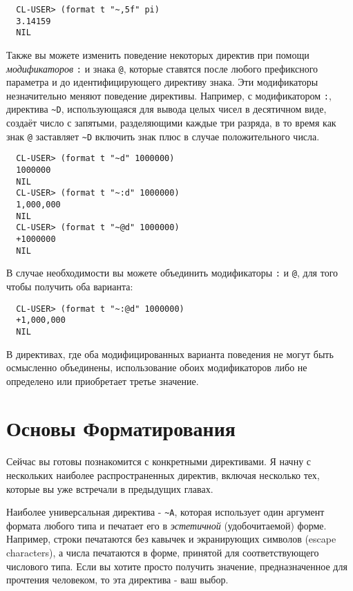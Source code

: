 {\begin{verbatim}
  CL-USER> (format t "~,5f" pi)
  3.14159
  NIL
\end{verbatim}

Также вы можете изменить поведение некоторых директив при помощи \textit{модификаторов}
\lstinline!:! и знака \lstinline!@!, которые ставятся после любого префиксного параметра и
до идентифицирующего директиву знака. Эти модификаторы незначительно меняют поведение
директивы. Например, с модификатором \lstinline!:!, директива \lstinline!~D!,
использующаяся для вывода целых чисел в десятичном виде, создаёт число с запятыми,
разделяющими каждые три разряда, в то время как знак \lstinline!@! заставляет
\lstinline!~D!  включить знак плюс в случае положительного числа.

\begin{verbatim}
  CL-USER> (format t "~d" 1000000)
  1000000
  NIL
  CL-USER> (format t "~:d" 1000000)
  1,000,000
  NIL
  CL-USER> (format t "~@d" 1000000)
  +1000000
  NIL
\end{verbatim}

В случае необходимости вы можете объединить модификаторы \lstinline!:! и \lstinline!@!,
для того чтобы получить оба варианта:

\begin{verbatim}
  CL-USER> (format t "~:@d" 1000000)
  +1,000,000
  NIL
\end{verbatim}

В директивах, где оба модифицированных варианта поведения не могут быть осмысленно
объединены, использование обоих модификаторов либо не определено или приобретает третье
значение.

\section{Основы Форматирования}

Сейчас вы готовы познакомится с конкретными директивами. Я начну с нескольких наиболее
распространенных директив, включая несколько тех, которые вы уже встречали в предыдущих
главах.

Наиболее универсальная директива - \lstinline!~A!, которая использует один аргумент
формата любого типа и печатает его в \textit{эстетичной} (удобочитаемой) форме. Например,
строки печатаются без кавычек и экранирующих символов (escape characters), а числа
печатаются в форме, принятой для соответствующего числового типа. Если вы хотите просто
получить значение, предназначенное для прочтения человеком, то эта директива - ваш выбор.

}

